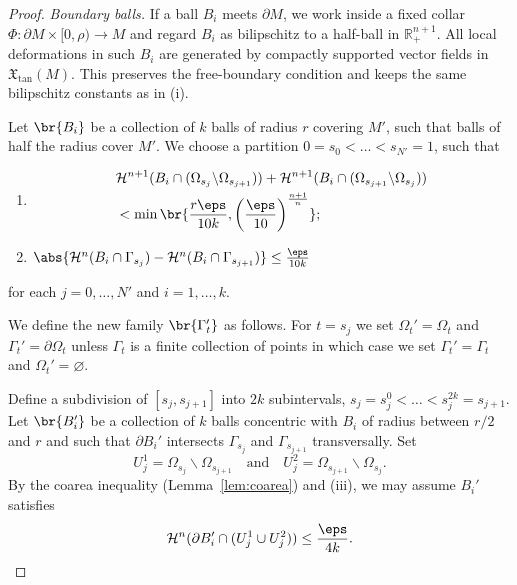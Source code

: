 \begin{lemma}
\begin{proof}
        \noindent\emph{Boundary balls.}
        If a ball $B_i$ meets $\partial M$, we work inside a fixed collar
        $\Phi:\partial M\times[0,\rho)\to M$ and regard $B_i$ as bilipschitz to a half-ball
        in $\mathbb R^{n+1}_+$. All
        local deformations in such $B_i$ are generated by compactly
        supported vector fields in $\mathfrak{X}_{\mathrm{tan}}(M)$.
        This preserves the free-boundary condition and keeps the same
        bilipschitz constants as in (i).

        Let $\br{B_i}$ be a collection of $k$ balls of radius $r$ covering $M'$, such that balls of half the radius cover $M'$. We choose a partition $0 = s_0 < \dots < s_{N'} = 1$, such that
        \begin{enumerate}
            \item[(iii)] \begin{align*}
            &\mathcal{H}^{n + 1}(B_i\cap(\Omega_{s_j}\backslash\Omega_{s_{j + 1}})) + \mathcal{H}^{n + 1}(B_i\cap(\Omega_{s_{j + 1}}\backslash\Omega_{s_j})) \\
            &< \min\br{\frac{r\eps}{10k}, \left(\frac{\eps}{10}\right)^{\frac{n + 1}{n}}};
            \end{align*}
            \item[(iv)] $\abs{\mathcal{H}^n(B_i\cap \Gamma_{s_j}) - \mathcal{H}^n(B_i\cap \Gamma_{s_{j + 1}})} \leq \frac{\eps}{10k}$
        \end{enumerate}
        for each $j = 0, \dots, N'$ and $i = 1, \dots, k$.

        We define the new family $\br{\Gamma_t'}$ as follows. For $t = s_j$ we set $\Omega_t' = \Omega_t$ and $\Gamma_t' = \partial\Omega_t$ unless $\Gamma_t$ is a finite collection of points in which case we set $\Gamma_t' = \Gamma_t$ and $\Omega_t' = \varnothing$.

        Define a subdivision of $[s_j, s_{j + 1}]$ into $2k$ subintervals, $s_j = s_j^0 < \dots < s_j^{2k} = s_{j + 1}$. Let $\br{B_i'}$ be a collection of $k$ balls concentric with $B_i$ of radius between $r/2$ and $r$ and such that $\partial B_i'$ intersects $\Gamma_{s_j}$ and $\Gamma_{s_{j + 1}}$ transversally. Set
        \begin{equation*}
            U_j^1 = \Omega_{s_j}\backslash\Omega_{s_{j + 1}}\quad\text{and}\quad U_j^2 = \Omega_{s_{j + 1}}\backslash\Omega_{s_j}.
        \end{equation*}
        By the coarea inequality (Lemma~\ref{lem:coarea}) and (iii), we may assume $B_i'$ satisfies
        \begin{equation}\label{eq:coarea-small-boundary-ball}
            \mathcal{H}^n(\partial B_i'\cap (U_j^1\cup U_j^2)) \leq \frac{\eps}{4k}.
        \end{equation}


\end{proof}
\end{lemma}
